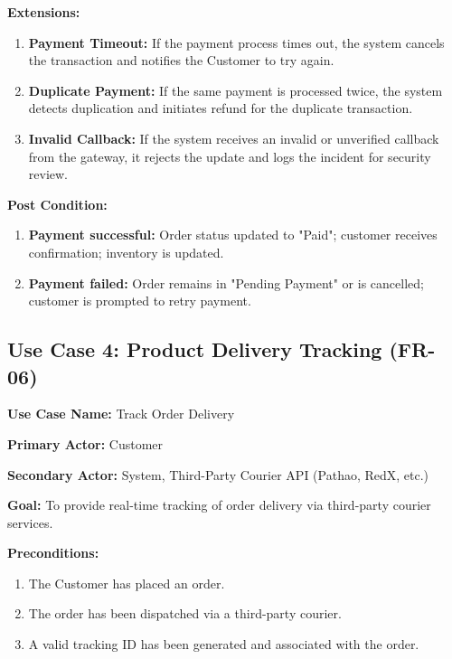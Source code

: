 \textbf{Extensions:}
\begin{enumerate}
    \item[3a.] \textbf{Payment Timeout:} If the payment process times out, the system cancels the transaction and notifies the Customer to try again.
    \item[3b.] \textbf{Duplicate Payment:} If the same payment is processed twice, the system detects duplication and initiates refund for the duplicate transaction.
    \item[3c.] \textbf{Invalid Callback:} If the system receives an invalid or unverified callback from the gateway, it rejects the update and logs the incident for security review.
\end{enumerate}

\textbf{Post Condition:}
\begin{enumerate}
    \item \textbf{Payment successful:} Order status updated to "Paid"; customer receives confirmation; inventory is updated.
    \item \textbf{Payment failed:} Order remains in "Pending Payment" or is cancelled; customer is prompted to retry payment.
\end{enumerate}

\subsection*{Use Case 4: Product Delivery Tracking (FR-06)}

\textbf{Use Case Name:} Track Order Delivery

\textbf{Primary Actor:} Customer

\textbf{Secondary Actor:} System, Third-Party Courier API (Pathao, RedX, etc.)

\textbf{Goal:} To provide real-time tracking of order delivery via third-party courier services.

\textbf{Preconditions:}
\begin{enumerate}
    \item The Customer has placed an order.
    \item The order has been dispatched via a third-party courier.
    \item A valid tracking ID has been generated and associated with the order.
\end{enumerate}


